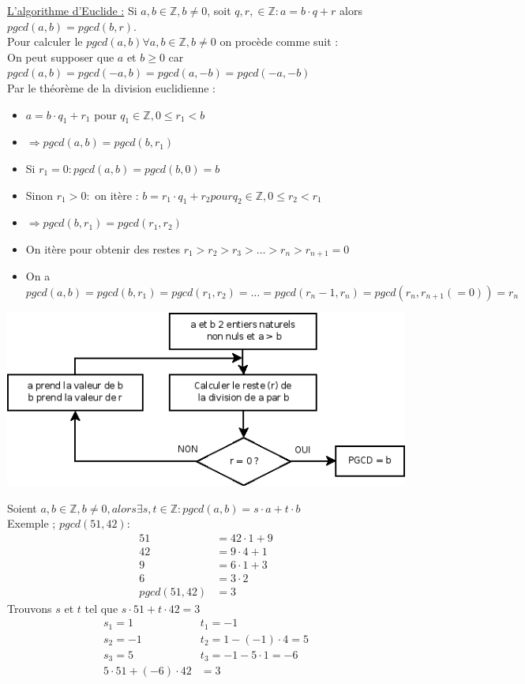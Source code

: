 \documentclass[11pt]{article}
\begin{document}
			\underline{L'algorithme d'Euclide :} Si $a, b \in \mathbb Z, b \neq 0$, soit $q, r, \in \mathbb Z : a = b \cdot q + r$  alors $pgcd(a, b) = pgcd(b, r)$.\\
			Pour calculer le $pgcd(a, b) \forall a, b \in \mathbb Z, b \neq 0$ on procède comme suit :\\
			On peut supposer que $a$ et $b \geq 0$ car $pgcd(a, b) = pgcd(-a, b) = pgcd(a, -b) = pgcd(-a, -b)$\\
			Par le théorème de la division euclidienne :
			\begin{itemize}
				\item $a = b \cdot q_1 + r_1$ pour $q_1 \in \mathbb Z, 0 \leq r_1 < b$
				\item $\Rightarrow pgcd(a, b) = pgcd(b, r_1)$
				\item Si $r_1 = 0 : pgcd(a, b) = pgcd(b, 0) = b$
				\item Sinon $r_1 > 0 :$ on itère : $b = r_1 \cdot q_1 + r_2  pour q_2 \in \mathbb Z, 0 \leq r_2 < r_1$
				\item $\Rightarrow pgcd(b, r_1) = pgcd(r_1, r_2)$
				\item On itère pour obtenir des restes $r_1 > r_2 > r_3 > … > r_n > r_{n+1} = 0$
				\item On a $pgcd(a, b) = pgcd(b, r_1) = pgcd(r_1, r_2) = … = pgcd(r_n-1, r_n) = pgcd(r_n, r_{n+1} (=0) ) = r_n$
			\end{itemize} 
			\begin{center}
				\includegraphics[scale=0.6]{Algorithme_PGCD.png}
			\end{center}

			Soient $a, b \in \mathbb Z, b \neq 0, alors \exists s, t \in \mathbb Z : pgcd(a, b) = s \cdot a + t \cdot b$\\
			Exemple ; $pgcd(51,42)$:
			\begin{align*}
				51 &= 42 \cdot 1 + 9\\
				42 &= 9 \cdot 4 + 1\\
				9 &= 6 \cdot 1 + 3\\
				6 &= 3 \cdot 2\\
				pgcd(51,42) &= 3
			\end{align*}
			Trouvons $s$ et $t$ tel que $s \cdot 51 + t \cdot 42 = 3$
			\begin{align*}
				s_1 = 1\quad & t_1 = -1\\
				s_2 = -1\quad & t_2 = 1 - (-1) \cdot 4 = 5\\
				s_3 = 5\quad & t_3 = -1 - 5 \cdot 1 = -6\\
				5 \cdot 51 + (-6) \cdot 42 &= 3
			\end{align*}
\end{document}

